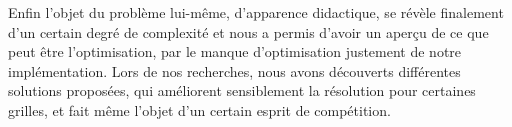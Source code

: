 \documentclass{report}
\begin{document}
Enfin l'objet du problème lui-même, d’apparence didactique, se révèle finalement d'un certain degré de complexité et nous a permis d'avoir un aperçu de ce que peut être l'optimisation, par le manque d'optimisation justement de notre implémentation. Lors de nos recherches, nous avons découverts différentes solutions proposées, qui améliorent sensiblement la résolution pour certaines grilles, et fait même l'objet d'un certain esprit de compétition.
\end{document}
